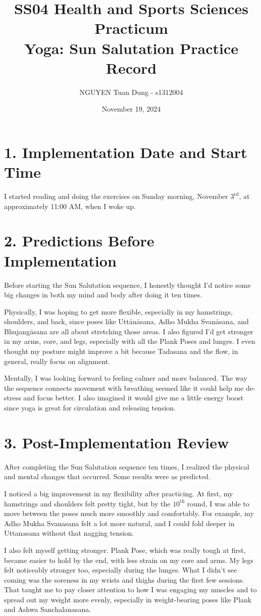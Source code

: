 \documentclass[a4paper,10.5pt]{article}
\title{SS04 Health and Sports Sciences Practicum\\Yoga: Sun Salutation Practice Record}
\author{NGUYEN Tuan Dung - s1312004}
\date{November 19, 2024}
\begin{document}
\maketitle

\section*{1. Implementation Date and Start Time}
I started reading and doing the exercises on Sunday morning, November $3^{\mathrm{rd}}$, at approximately 11:00 AM, when I woke up.
\section*{2. Predictions Before Implementation}
Before starting the Sun Salutation sequence, I honestly thought I’d notice some big changes in both my mind and body after doing it ten times.

Physically, I was hoping to get more flexible, especially in my hamstrings, shoulders, and back, since poses like Uttānāsana, Adho Mukha Svanāsana, and Bhujangāsana are all about stretching those areas. I also figured I’d get stronger in my arms, core, and legs, especially with all the Plank Poses and lunges. I even thought my posture might improve a bit because Tadasana and the flow, in general, really focus on alignment.

Mentally, I was looking forward to feeling calmer and more balanced. The way the sequence connects movement with breathing seemed like it could help me de-stress and focus better. I also imagined it would give me a little energy boost since yoga is great for circulation and releasing tension.

\section*{3. Post-Implementation Review}
After completing the Sun Salutation sequence ten times, I realized the physical and mental changes that occurred. Some results were as predicted.

I noticed a big improvement in my flexibility after practicing. At first, my hamstrings and shoulders felt pretty tight, but by the $10^{\mathrm{th}}$ round, I was able to move between the poses much more smoothly and comfortably. For example, my Adho Mukha Svanasana felt a lot more natural, and I could fold deeper in Uttanasana without that nagging tension.

I also felt myself getting stronger. Plank Pose, which was really tough at first, became easier to hold by the end, with less strain on my core and arms. My legs felt noticeably stronger too, especially during the lunges. What I didn’t see coming was the soreness in my wrists and thighs during the first few sessions. That taught me to pay closer attention to how I was engaging my muscles and to spread out my weight more evenly, especially in weight-bearing poses like Plank and Ashwa Sanchalanasana.
\end{document}
